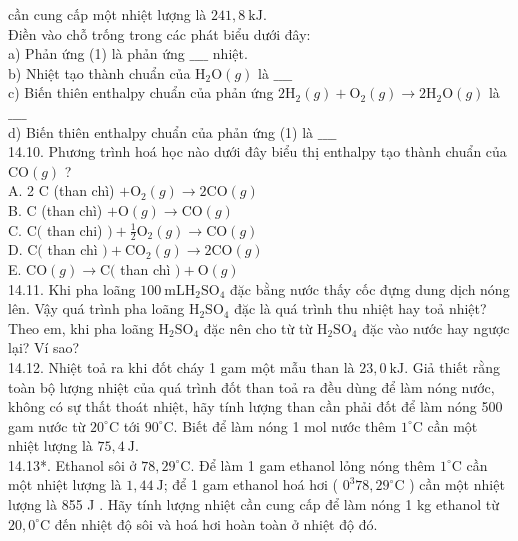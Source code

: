 \documentclass[10pt]{article}
\begin{document}
cần cung cấp một nhiệt lượng là $241,8 \mathrm{~kJ}$.\\
Điền vào chỗ trống trong các phát biểu dưới đây:\\
a) Phản ứng (1) là phản ứng $\_\_\_\_$ nhiệt.\\
b) Nhiệt tạo thành chuẩn của $\mathrm{H}_{2} \mathrm{O}(g)$ là $\_\_\_\_$\\
c) Biến thiên enthalpy chuẩn của phản ứng $2 \mathrm{H}_{2}(g)+\mathrm{O}_{2}(g) \rightarrow 2 \mathrm{H}_{2} \mathrm{O}(g)$ là $\_\_\_\_$\\
d) Biến thiên enthalpy chuẩn của phản ứng (1) là $\_\_\_\_$\\
14.10. Phương trình hoá học nào dưới đây biểu thị enthalpy tạo thành chuẩn của $\mathrm{CO}(g)$ ?\\
A. 2 C (than chì) $+\mathrm{O}_{2}(g) \rightarrow 2 \mathrm{CO}(g)$\\
B. C (than chì) $+\mathrm{O}(g) \rightarrow \mathrm{CO}(g)$\\
C. $\mathrm{C}($ than chi) $)+\frac{1}{2} \mathrm{O}_{2}(g) \rightarrow \mathrm{CO}(g)$\\
D. $\mathrm{C}($ than chì $)+\mathrm{CO}_{2}(g) \rightarrow 2 \mathrm{CO}(g)$\\
E. $\mathrm{CO}(g) \rightarrow \mathrm{C}($ than chì $)+\mathrm{O}(g)$\\
14.11. Khi pha loãng $100 \mathrm{~mL} \mathrm{H}_{2} \mathrm{SO}_{4}$ đặc bằng nước thấy cốc đựng dung dịch nóng lên. Vậy quá trình pha loãng $\mathrm{H}_{2} \mathrm{SO}_{4}$ đặc là quá trình thu nhiệt hay toả nhiệt? Theo em, khi pha loãng $\mathrm{H}_{2} \mathrm{SO}_{4}$ đặc nên cho từ từ $\mathrm{H}_{2} \mathrm{SO}_{4}$ đặc vào nước hay ngược lại? Ví sao?\\
14.12. Nhiệt toả ra khi đốt cháy 1 gam một mẫu than là $23,0 \mathrm{~kJ}$. Giả thiết rằng toàn bộ lượng nhiệt của quá trình đốt than toả ra đều dùng để làm nóng nước, không có sự thất thoát nhiệt, hãy tính lượng than cần phải đốt để làm nóng 500 gam nước từ $20^{\circ} \mathrm{C}$ tới $90^{\circ} \mathrm{C}$. Biết để làm nóng 1 mol nước thêm $1^{\circ} \mathrm{C}$ cần một nhiệt lượng là $75,4 \mathrm{~J}$.\\
14.13*. Ethanol sôi ở $78,29^{\circ} \mathrm{C}$. Để làm 1 gam ethanol lỏng nóng thêm $1^{\circ} \mathrm{C}$ cần một nhiệt lượng là $1,44 \mathrm{~J}$; để 1 gam ethanol hoá hơi ( $0^{3} 78,29^{\circ} \mathrm{C}$ ) cần một nhiệt lượng là 855 J . Hãy tính lượng nhiệt cần cung cấp để làm nóng 1 kg ethanol từ $20,0^{\circ} \mathrm{C}$ đến nhiệt độ sôi và hoá hơi hoàn toàn ở nhiệt độ đó.
\end{document}
